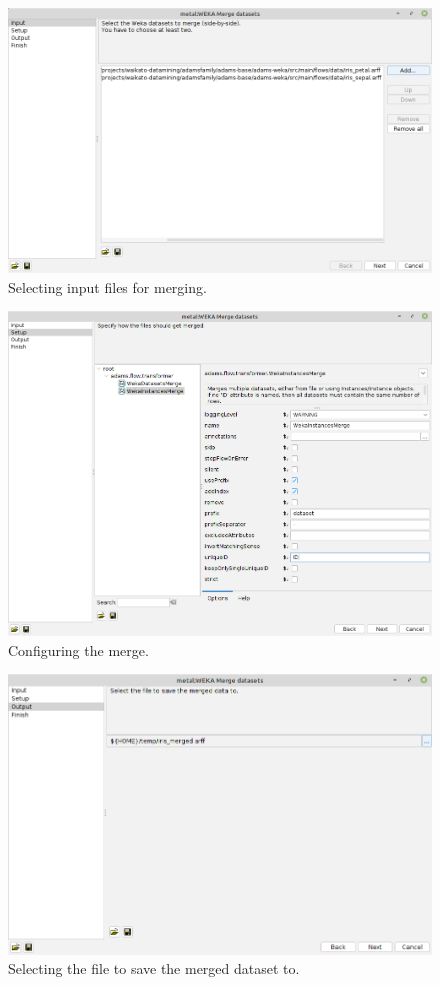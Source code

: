\begin{figure}[htb]
  \centering
  \includegraphics[width=12.0cm]{images/merge_datasets1.png}
  \caption{Selecting input files for merging.}
  \label{merge_datasets1}
\end{figure}

\begin{figure}[htb]
  \centering
  \includegraphics[width=12.0cm]{images/merge_datasets2.png}
  \caption{Configuring the merge.}
  \label{merge_datasets2}
\end{figure}

\begin{figure}[htb]
  \centering
  \includegraphics[width=12.0cm]{images/merge_datasets3.png}
  \caption{Selecting the file to save the merged dataset to.}
  \label{merge_datasets3}
\end{figure}

